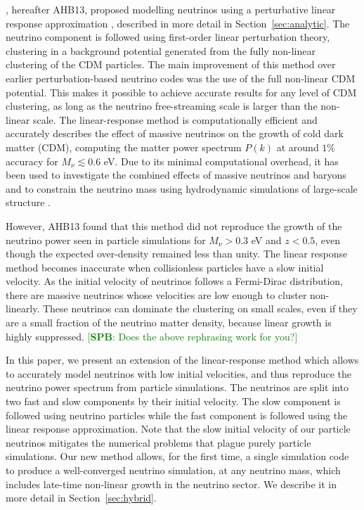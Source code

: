 \documentclass[useAMS, usenatbib]{mnras}
\newcommand{\spb}[1]{{\textcolor{green}{[{\bf SPB}: #1]}}}
\begin{document}
\cite{AHB}, hereafter AHB13, proposed modelling neutrinos using a perturbative linear response approximation \citep{Bond_1980, Ma_1994}, described in more detail in Section~\ref{sec:analytic}. The neutrino component is followed using first-order linear perturbation theory, clustering in a background potential generated from the fully non-linear clustering of the CDM particles. The main improvement of this method over earlier perturbation-based neutrino codes \citep{Brandbyge_2009} was the use of the full non-linear CDM potential. This makes it possible to achieve accurate results for any level of CDM clustering, as long as the neutrino free-streaming scale is larger than the non-linear scale.
The linear-response method is computationally efficient and accurately describes the effect of massive neutrinos on the growth of cold dark matter (CDM), computing the matter power spectrum $P(k)$ at around $1\%$ accuracy for $M_\nu \lesssim 0.6$ eV.
Due to its minimal computational overhead,
it has been used to investigate the combined effects of massive neutrinos and baryons \citep{Mummery_2017} and to constrain the neutrino mass using hydrodynamic simulations of large-scale structure \citep{McCarthy_2018, McCarthy_2017}.

However, AHB13 found that this method did not reproduce the growth of the neutrino power seen in particle simulations for $M_\nu > 0.3$ eV  and $z < 0.5$, even though the expected over-density remained less than unity. The linear response method becomes inaccurate when collisionless particles have a slow initial velocity. As the initial velocity of neutrinos follows a Fermi-Dirac distribution, there are massive neutrinos whose velocities are low enough to cluster non-linearly. These neutrinos can dominate the clustering on small scales, even if they are a small fraction of the neutrino matter density, because linear growth is highly suppressed. \spb{Does the above rephrasing work for you?}

In this paper, we present an extension of the linear-response method which allows to accurately model neutrinos with low initial velocities, and thus reproduce the neutrino power spectrum from particle simulations. The neutrinos are split into two fast and slow components by their initial velocity. The slow component is followed using neutrino particles while the fast component is followed using the linear response approximation.  Note that the slow initial velocity of our particle neutrinos mitigates the numerical problems that plague purely particle simulations. Our new method allows, for the first time, a single simulation code to produce a well-converged neutrino simulation, at any neutrino mass, which includes late-time non-linear growth in the neutrino sector. We describe it in more detail in Section~\ref{sec:hybrid}.
\end{document}
